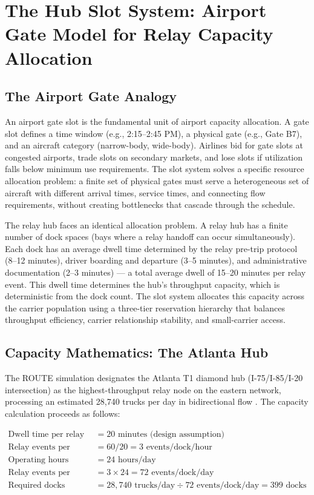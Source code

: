\section{The Hub Slot System: Airport Gate Model for Relay Capacity Allocation}
\label{sec:hub-slot}

\subsection{The Airport Gate Analogy}

An airport gate slot is the fundamental unit of airport capacity allocation. A gate slot defines a time window (e.g., 2:15--2:45 PM), a physical gate (e.g., Gate B7), and an aircraft category (narrow-body, wide-body). Airlines bid for gate slots at congested airports, trade slots on secondary markets, and lose slots if utilization falls below minimum use requirements. The slot system solves a specific resource allocation problem: a finite set of physical gates must serve a heterogeneous set of aircraft with different arrival times, service times, and connecting flow requirements, without creating bottlenecks that cascade through the schedule.

The relay hub faces an identical allocation problem. A relay hub has a finite number of dock spaces (bays where a relay handoff can occur simultaneously). Each dock has an average dwell time determined by the relay pre-trip protocol (8--12 minutes), driver boarding and departure (3--5 minutes), and administrative documentation (2--3 minutes) --- a total average dwell of 15--20 minutes per relay event. This dwell time determines the hub's throughput capacity, which is deterministic from the dock count. The slot system allocates this capacity across the carrier population using a three-tier reservation hierarchy that balances throughput efficiency, carrier relationship stability, and small-carrier access.

\subsection{Capacity Mathematics: The Atlanta Hub}

The ROUTE simulation designates the Atlanta T1 diamond hub (I-75/I-85/I-20 intersection) as the highest-throughput relay node on the eastern network, processing an estimated 28,740 trucks per day in bidirectional flow \citep{ROUTE_E1}. The capacity calculation proceeds as follows:

\begin{align*}
\text{Dwell time per relay event} &= 20 \text{ minutes (design assumption)} \\
\text{Relay events per dock per hour} &= 60/20 = 3 \text{ events/dock/hour} \\
\text{Operating hours} &= 24 \text{ hours/day} \\
\text{Relay events per dock per day} &= 3 \times 24 = 72 \text{ events/dock/day} \\
\text{Required docks} &= 28{,}740 \text{ trucks/day} \div 72 \text{ events/dock/day} = 399 \text{ docks}
\end{align*}

